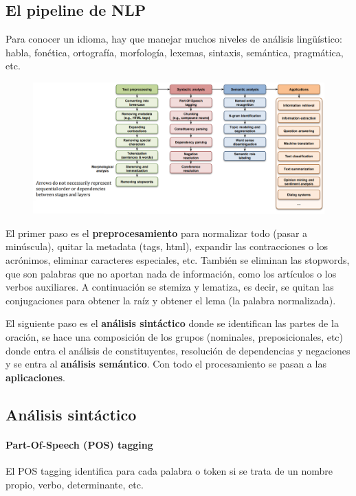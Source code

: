 \subsection{El pipeline de NLP}
Para conocer un idioma, hay que manejar muchos niveles de análisis lingüístico: habla, fonética, ortografía, morfología, lexemas, sintaxis, semántica, pragmática, etc. 

\begin{figure}[h]
\centering
\includegraphics[width = \textwidth]{figs/nlp-pipeline.png}
\end{figure}

El primer paso es el \textbf{preprocesamiento} para normalizar todo (pasar a minúscula), quitar la metadata (tags, html), expandir las contracciones o los acrónimos, eliminar caracteres especiales, etc. También se eliminan las stopwords, que son palabras que no aportan nada de información, como los artículos o los verbos auxiliares. A continuación se stemiza y lematiza, es decir, se quitan las conjugaciones para obtener la raíz y obtener el lema (la palabra normalizada).

El siguiente paso es el \textbf{análisis sintáctico} donde se identifican las partes de la oración, se hace una composición de los grupos (nominales, preposicionales, etc) donde entra el análisis de constituyentes, resolución de dependencias y negaciones y se entra al \textbf{análisis semántico}. Con todo el procesamiento se pasan a las \textbf{aplicaciones}.

\subsection{Análisis sintáctico}
\paragraph{Part-Of-Speech (POS) tagging}
El POS tagging identifica para cada palabra o token si se trata de un nombre propio, verbo, determinante, etc. 

